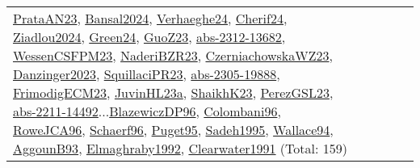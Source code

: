 {\begin{longtable}{p{3cm}r>{\raggedright\arraybackslash}p{6cm}>{\raggedright\arraybackslash}p{6cm}>{\raggedright\arraybackslash}p{8cm}}
\hyperref[detail:PrataAN23]{PrataAN23}, \hyperref[detail:Bansal2024]{Bansal2024}, \hyperref[detail:Verhaeghe24]{Verhaeghe24}, \hyperref[detail:Cherif24]{Cherif24}, \hyperref[detail:Ziadlou2024]{Ziadlou2024}, \hyperref[detail:Green24]{Green24}, \hyperref[detail:GuoZ23]{GuoZ23}, \hyperref[detail:abs-2312-13682]{abs-2312-13682}, \hyperref[detail:WessenCSFPM23]{WessenCSFPM23}, \hyperref[detail:NaderiBZR23]{NaderiBZR23}, \hyperref[detail:CzerniachowskaWZ23]{CzerniachowskaWZ23}, \hyperref[detail:Danzinger2023]{Danzinger2023}, \hyperref[detail:SquillaciPR23]{SquillaciPR23}, \hyperref[detail:abs-2305-19888]{abs-2305-19888}, \hyperref[detail:FrimodigECM23]{FrimodigECM23}, \hyperref[detail:JuvinHL23a]{JuvinHL23a}, \hyperref[detail:ShaikhK23]{ShaikhK23}, \hyperref[detail:PerezGSL23]{PerezGSL23}, \hyperref[detail:abs-2211-14492]{abs-2211-14492}...\hyperref[detail:BlazewiczDP96]{BlazewiczDP96}, \hyperref[detail:Colombani96]{Colombani96}, \hyperref[detail:RoweJCA96]{RoweJCA96}, \hyperref[detail:Schaerf96]{Schaerf96}, \hyperref[detail:Puget95]{Puget95}, \hyperref[detail:Sadeh1995]{Sadeh1995}, \hyperref[detail:Wallace94]{Wallace94}, \hyperref[detail:AggounB93]{AggounB93}, \hyperref[detail:Elmaghraby1992]{Elmaghraby1992}, \hyperref[detail:Clearwater1991]{Clearwater1991} (Total: 159)\\

\end{longtable}}
